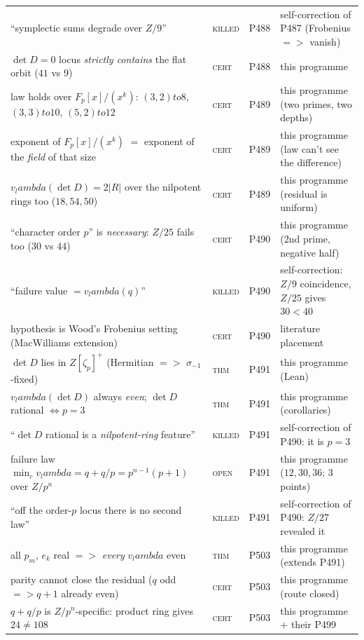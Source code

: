 \documentclass[12pt,a4paper]{article}
\def\mathbb#1{#1}%
\def\lambda{lambda}%
\def\to{ to }%
\def\Rightarrow{ => }%
\theoremstyle{definition}
\newcommand{\FF}{\mathbb{F}}
\newcommand{\ZZ}{\mathbb{Z}}
\begin{document}
\begin{center}
\begin{tabular}{@{}p{}llp{}@{}}
``symplectic sums degrade over $\ZZ/9$'' & \textsc{killed} & P488 & self-correction of P487 (Frobenius $\Rightarrow$ vanish) \\
$\det D=0$ locus \emph{strictly contains} the flat orbit ($41$ vs $9$) & \textsc{cert} & P488 & this programme \\
law holds over $\FF_p[x]/(x^k)$: $(3,2){\to}8$, $(3,3){\to}10$, $(5,2){\to}12$ & \textsc{cert} & P489 & this programme (two primes, two depths) \\
exponent of $\FF_p[x]/(x^k)$ $=$ exponent of the \emph{field} of that size & \textsc{cert} & P489 & this programme (law can't see the difference) \\
$v_\lambda(\det D)=2|R|$ over the nilpotent rings too ($18,54,50$) & \textsc{cert} & P489 & this programme (residual is uniform) \\
``character order $p$'' is \emph{necessary}: $\ZZ/25$ fails too ($30$ vs $44$) & \textsc{cert} & P490 & this programme (2nd prime, negative half) \\
``failure value $=v_\lambda(q)$'' & \textsc{killed} & P490 & self-correction: $\ZZ/9$ coincidence, $\ZZ/25$ gives $30<40$ \\
hypothesis is Wood's Frobenius setting (MacWilliams extension) & \textsc{cert} & P490 & literature placement \\
$\det D$ lies in $\ZZ[\zeta_p]^+$ (Hermitian $\Rightarrow$ $\sigma_{-1}$-fixed) & \textsc{thm} & P491 & this programme (Lean) \\
$v_\lambda(\det D)$ always \emph{even}; $\det D$ rational $\iff p{=}3$ & \textsc{thm} & P491 & this programme (corollaries) \\
``$\det D$ rational is a \emph{nilpotent-ring} feature'' & \textsc{killed} & P491 & self-correction of P490: it is $p{=}3$ \\
failure law $\min_c v_\lambda = q{+}q/p = p^{n-1}(p{+}1)$ over $\ZZ/p^n$ & \textsc{open} & P491 & this programme ($12,30,36$; 3 points) \\
``off the order-$p$ locus there is no second law'' & \textsc{killed} & P491 & self-correction of P490: $\ZZ/27$ revealed it \\
all $p_m$, $e_k$ real $\Rightarrow$ \emph{every} $v_\lambda$ even & \textsc{thm} & P503 & this programme (extends P491) \\
parity cannot close the residual ($q$ odd $\Rightarrow q{+}1$ already even) & \textsc{cert} & P503 & this programme (route closed) \\
$q{+}q/p$ is $\ZZ/p^n$-specific: product ring gives $24\neq108$ & \textsc{cert} & P503 & this programme $+$ their P499 \\

\end{tabular}
\end{center}
\end{document}

